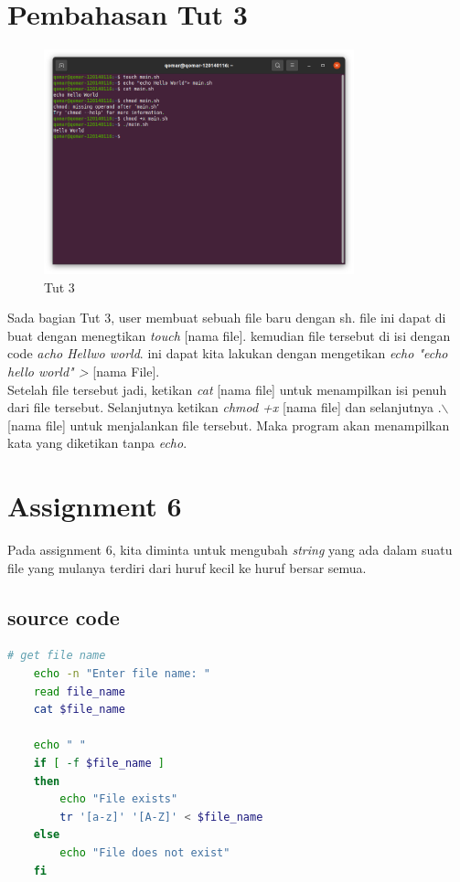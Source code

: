 \documentclass[11pt,a4paper]{article}
\begin{document}
\section{Pembahasan Tut 3}
\begin{figure}[h]
	\centering
	\includegraphics[width=0.8\textwidth ]{figure/tut3.png}
	\caption{Tut 3}
\end{figure}
	Sada bagian Tut 3, user membuat sebuah file baru dengan sh. file ini dapat di buat dengan menegtikan \textit{touch} [nama file]. kemudian file tersebut di isi dengan code \textit{acho Hellwo world}. ini dapat kita lakukan dengan mengetikan \textit{echo "echo hello world" >} [nama File].\\
	Setelah file tersebut jadi, ketikan \textit{cat} [nama file] untuk menampilkan isi penuh dari file tersebut.
	Selanjutnya ketikan \textit{chmod +x } [nama file] dan selanjutnya .$\backslash$ [nama file] untuk menjalankan file tersebut. Maka program akan menampilkan kata yang diketikan tanpa \textit{echo}.

\newpage
\section{Assignment 6}
Pada assignment 6, kita diminta untuk mengubah \textit{string} yang ada dalam suatu file yang mulanya terdiri dari huruf kecil ke
huruf bersar semua.
\subsection*{source code}
\begin{lstlisting}[language=bash, caption={source code}]
	# get file name
	echo -n "Enter file name: "
	read file_name
	cat $file_name

	echo " "
	if [ -f $file_name ]
	then
		echo "File exists"
		tr '[a-z]' '[A-Z]' < $file_name
	else
		echo "File does not exist"
	fi

\end{lstlisting}
\end{document}
